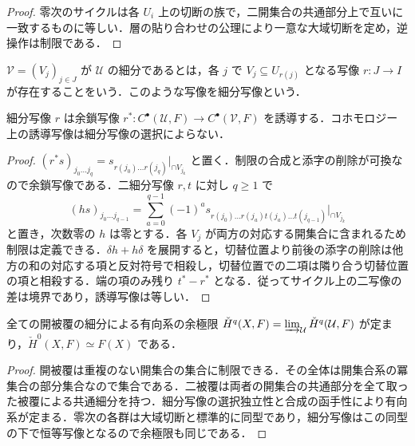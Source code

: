 \begin{proof}
零次のサイクルは各 $U_i$ 上の切断の族で，二開集合の共通部分上で互いに一致するものに等しい．層の貼り合わせの公理により一意な大域切断を定め，逆操作は制限である．
\end{proof}
\begin{defn}[開被覆の細分]
$\mathcal V=(V_j)_{j\in J}$ が $\mathcal U$ の細分であるとは，各 $j$ で $V_j\subseteq U_{r(j)}$ となる写像 $r:J\to I$ が存在することをいう．このような写像を細分写像という．
\end{defn}
\begin{prop}[細分の誘導写像]
細分写像 $r$ は余鎖写像 $r^*:C^\bullet(\mathcal U,F)\to C^\bullet(\mathcal V,F)$ を誘導する．コホモロジー上の誘導写像は細分写像の選択によらない．
\end{prop}
\begin{proof}
$(r^*s)_{j_0\ldots j_q}=s_{r(j_0)\ldots r(j_q)}|_{\cap V_{j_k}}$ と置く．制限の合成と添字の削除が可換なので余鎖写像である．二細分写像 $r,t$ に対し $q\geq1$ で
\[
 (hs)_{j_0\ldots j_{q-1}}=\sum_{a=0}^{q-1}(-1)^a s_{r(j_0)\ldots r(j_a)t(j_a)\ldots t(j_{q-1})}|_{\cap V_{j_k}}
\]
と置き，次数零の $h$ は零とする．各 $V_j$ が両方の対応する開集合に含まれるため制限は定義できる．$\delta h+h\delta$ を展開すると，切替位置より前後の添字の削除は他方の和の対応する項と反対符号で相殺し，切替位置での二項は隣り合う切替位置の項と相殺する．端の項のみ残り $t^*-r^*$ となる．従ってサイクル上の二写像の差は境界であり，誘導写像は等しい．
\end{proof}
\begin{prop}[開被覆全体のČechコホモロジー]
全ての開被覆の細分による有向系の余極限 $\check H^q(X,F)=\varinjlim_{\mathcal U}\check H^q(\mathcal U,F)$ が定まり，$\check H^0(X,F)\simeq F(X)$ である．
\end{prop}
\begin{proof}
開被覆は重複のない開集合の集合に制限できる．その全体は開集合系の冪集合の部分集合なので集合である．二被覆は両者の開集合の共通部分を全て取った被覆による共通細分を持つ．細分写像の選択独立性と合成の函手性により有向系が定まる．零次の各群は大域切断と標準的に同型であり，細分写像はこの同型の下で恒等写像となるので余極限も同じである．
\end{proof}
